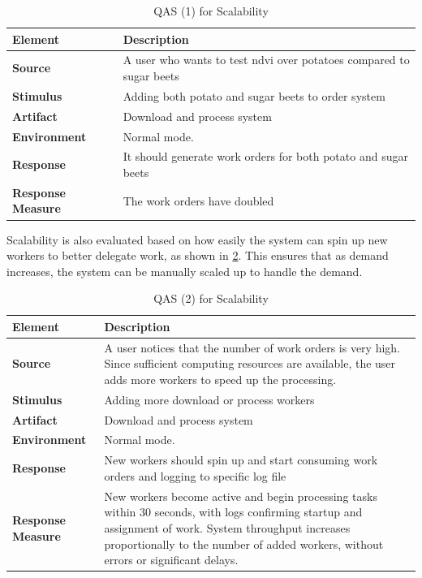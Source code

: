 \begin{table}[H]
    \centering
    \begin{tabular}{p{}|p{}}
         \hline
         \textbf{Element}& \textbf{Description}  \\
         \hline
         \textbf{Source}& A user who wants to test ndvi over potatoes compared to sugar beets\\
         \textbf{Stimulus} & Adding both potato and sugar beets to order system \\
         \textbf{Artifact} & Download and process system \\
         \textbf{Environment} & Normal mode. \\
         \textbf{Response} & It should generate work orders for both potato and sugar beets\\
         \textbf{Response Measure} & The work orders have doubled
    \end{tabular}
    \caption{QAS (1) for Scalability}
    \label{tab:QASScala1}
\end{table}

Scalability is also evaluated based on how easily the system can spin up new workers to better delegate work, as shown in \ref{tab:QASScala2}. This ensures that as demand increases, the system can be manually scaled up to handle the demand.
\begin{table}[H]
    \centering
    \begin{tabular}{p{}|p{}}
         \hline
         \textbf{Element}& \textbf{Description}  \\
         \hline
         \textbf{Source}& A user notices that the number of work orders is very high. Since sufficient computing resources are available, the user adds more workers to speed up the processing. \\
         \textbf{Stimulus} & Adding more download or process workers\\
         \textbf{Artifact} & Download and process system \\
         \textbf{Environment} & Normal mode. \\
         \textbf{Response} & New workers should spin up and start consuming work orders and logging to specific log file\\
         \textbf{Response Measure} & New workers become active and begin processing tasks within 30 seconds, with logs confirming startup and assignment of work. System throughput increases proportionally to the number of added workers, without errors or significant delays.
    \end{tabular}
    \caption{QAS (2) for Scalability}
    \label{tab:QASScala2}
\end{table}

